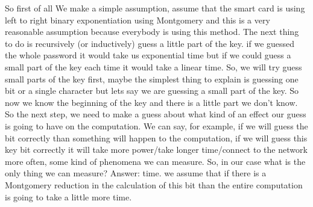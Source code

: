 So first of all We make a simple assumption, assume that the smart card is using
left to right binary exponentiation using Montgomery and this is a very
reasonable assumption because everybody is using this method. The next thing to
do is recursively (or inductively) guess a little part of the key. if we guessed
the whole password it would take us exponential time but if we could guess a
small part of the key each time it would take a linear time. So, we will try
guess small parts of the key first, maybe the simplest thing to explain is
guessing one bit or a single character but lets say we are guessing a small part
of the key. So now we know the beginning of the key and there is a little part
we don't know. So the next step, we need to make a guess about what kind of an
effect our guess is going to have on the computation. We can say, for example,
if we will guess the bit correctly than something will happen to the
computation, if we will guess this key bit correctly it will take more
power/take longer time/connect to the network more often, some kind of phenomena
we can measure. So, in our case what is the only thing we can measure? Answer:
time. we assume that if there is a Montgomery reduction in the calculation of
this bit than the entire computation is going to take a little more time.


